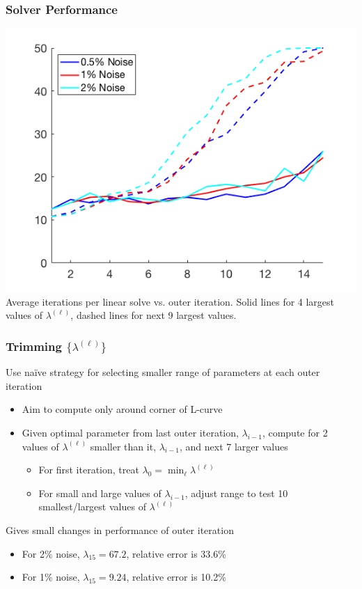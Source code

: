 \documentclass[12pt,t,xcolor=dvipsnames]{beamer}
\begin{document}
\begin{frame}
\frametitle{Solver Performance}

\begin{center}
  \includegraphics[width=0.7\linewidth]{Solver_stats}\\
  Average iterations per linear solve vs. outer iteration.  Solid
  lines for 4 largest values of $\lambda^{(\ell)}$, dashed lines for
  next 9 largest values.
\end{center}

\end{frame}

\begin{frame}
  \frametitle{Trimming $\{\lambda^{(\ell)}\}$}

  Use na\"ive strategy for selecting smaller range of parameters at
  each outer iteration
  \begin{itemize}
  \item Aim to compute only around corner of L-curve
    \item Given optimal parameter from last outer iteration,
      $\lambda_{i-1}$, compute for 2 values of $\lambda^{(\ell)}$
      smaller than it, $\lambda_{i-1}$, and next 7 larger values
      \begin{itemize}
\item For first iteration, treat $\lambda_0 = \min_\ell
  \lambda^{(\ell)}$
  \item For small and large values of $\lambda_{i-1}$, adjust range to
    test 10 smallest/largest values of $\lambda^{(\ell)}$
      \end{itemize}
      
  \end{itemize}

  Gives small changes in performance of outer iteration
  \begin{itemize}
  \item For 2\% noise, $\lambda_{15} = 67.2$, relative error is 33.6\%
    \item For 1\% noise, $\lambda_{15} = 9.24$, relative error is 10.2\%
  \end{itemize}
  
  \end{frame}
\end{document}
